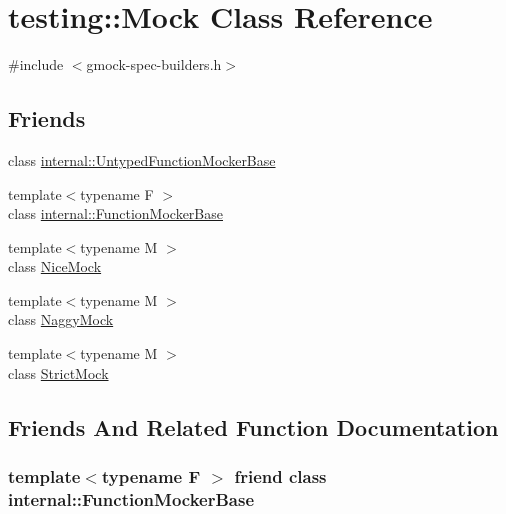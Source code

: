 \hypertarget{classtesting_1_1Mock}{}\section{testing\+:\+:Mock Class Reference}
\label{classtesting_1_1Mock}


{\ttfamily \#include $<$gmock-\/spec-\/builders.\+h$>$}

\subsection*{Friends}
\begin{DoxyCompactItemize}
\item 
class \hyperlink{classtesting_1_1Mock_aa199ba5b2fe114afc42c43912a582feb}{internal\+::\+Untyped\+Function\+Mocker\+Base}
\item 
{\footnotesize template$<$typename F $>$ }\\class \hyperlink{classtesting_1_1Mock_a1945aea400fdb50639e5cdf43c583687}{internal\+::\+Function\+Mocker\+Base}
\item 
{\footnotesize template$<$typename M $>$ }\\class \hyperlink{classtesting_1_1Mock_a9e796f79d4c876398f83aa7678dddc46}{Nice\+Mock}
\item 
{\footnotesize template$<$typename M $>$ }\\class \hyperlink{classtesting_1_1Mock_aee2e427ecb34e6662477add3bb5f8819}{Naggy\+Mock}
\item 
{\footnotesize template$<$typename M $>$ }\\class \hyperlink{classtesting_1_1Mock_a88b3d71476c27b82c88bd49e8297e20e}{Strict\+Mock}
\end{DoxyCompactItemize}


\subsection{Friends And Related Function Documentation}
\subsubsection[{\texorpdfstring{internal\+::\+Function\+Mocker\+Base}{internal::FunctionMockerBase}}]{\setlength{\rightskip}{0pt plus 5cm}template$<$typename F $>$ friend class {\bf internal\+::\+Function\+Mocker\+Base}\hspace{0.3cm}{\ttfamily [friend]}}\hypertarget{classtesting_1_1Mock_a1945aea400fdb50639e5cdf43c583687}{}\label{classtesting_1_1Mock_a1945aea400fdb50639e5cdf43c583687}
